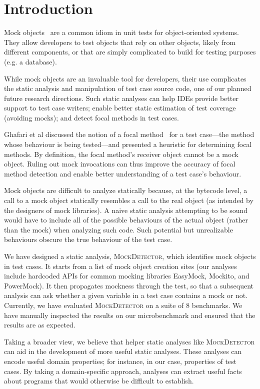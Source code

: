 \section{Introduction}
\label{sec:introduction}

Mock objects~\cite{beck02:_test_driven_devel} are a common idiom in
unit tests for object-oriented systems.  They allow developers to test objects that 
rely on other objects, likely from different components, or that are simply complicated 
to build for testing purposes (e.g. a database).

While mock objects are an invaluable tool for developers, their use
complicates the static analysis and manipulation of test case source code, one of our planned future
research directions. Such static analyses can help IDEs provide better
support to test case writers; enable better static estimation of test coverage
(avoiding mocks); and detect focal methods in test cases.

Ghafari et al discussed the notion of a focal method~\cite{ghafari15:_autom} for a test case---the method
whose behaviour is being tested---and presented a heuristic for determining focal methods.
By definition, the focal method's receiver object cannot be a mock object.
Ruling out mock invocations can thus improve the accuracy of focal method detection and
enable better understanding of a test case's behaviour.

Mock objects are difficult to analyze statically because, at the bytecode level,
a call to a mock object statically resembles a call to the real object (as
intended by the designers of mock libraries).
A naive static analysis attempting to be sound would have to include all of 
the possible behaviours of the actual object (rather than the mock) when analyzing such code. 
Such potential but unrealizable behaviours obscure the true behaviour 
of the test case.

We have designed a static analysis, \textsc{MockDetector}, which identifies
mock objects in test cases. It starts from a list of mock object creation sites
(our analyses include hardcoded APIs for common mocking libraries EasyMock, Mockito, and PowerMock). 
It then propagates mockness
through the test, so that a subsequent analysis
can ask whether a given variable in a test case contains a mock or not. Currently, we have
evaluated \textsc{MockDetector} on a suite of 8 benchmarks. We have manually inspected
the results on our microbenchmark and ensured that the results are as expected.

Taking a broader view, we believe that helper static analyses like \textsc{MockDetector} 
can aid
in the development of more useful static analyses. These analyses can
encode useful domain properties; for instance, in our case, properties
of test cases. By taking a domain-specific approach, analyses can extract
useful facts about programs that would otherwise be difficult to establish.

